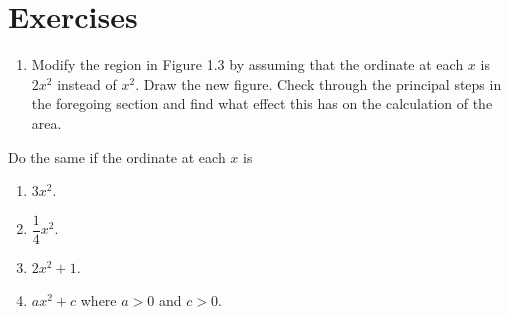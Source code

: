 \section{Exercises}\label{sec:1.1.4}

\begin{ex}\label{1.1.4.1}
  \begin{enumerate}
    \item Modify the region in Figure 1.3 by assuming that the ordinate at each \(x\) is \(2 x^2\) instead of \(x^2\).
          Draw the new figure.
          Check through the principal steps in the foregoing section and find what effect this has on the calculation of the area.
  \end{enumerate}
  Do the same if the ordinate at each \(x\) is
  \begin{enumerate}[resume]
    \item \(3 x^2\).
    \item \(\dfrac{1}{4} x^2\).
    \item \(2 x^2 + 1\).
    \item \(a x^2 + c\) where \(a > 0\) and \(c > 0\).
  \end{enumerate}
\end{ex}

